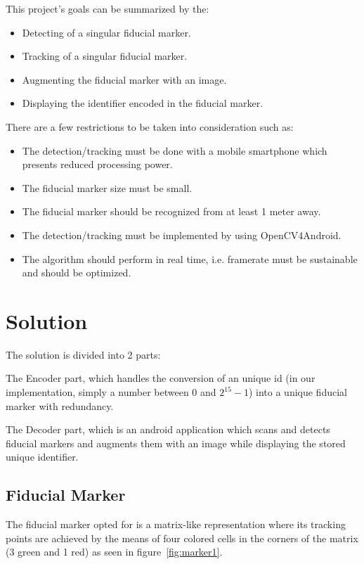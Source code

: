 \documentclass[DIV=calc, paper=a4, fontsize=11pt, twocolumn]{scrartcl}   %
\begin{document}
This project’s goals can be summarized by the:
\begin{itemize}
\item Detecting of a singular fiducial marker.
\item Tracking of a singular fiducial marker.
\item Augmenting the fiducial marker with an image.
\item Displaying the identifier encoded in the fiducial marker.
\end{itemize}

There are a few restrictions to be taken into consideration such as:
\begin{itemize}
\item The detection/tracking must be done with a mobile smartphone which presents reduced processing power.
\item The fiducial marker size must be small.
\item The fiducial marker should be recognized from at least 1 meter away.
\item The detection/tracking must be implemented by using OpenCV4Android.
\item The algorithm should perform in real time, i.e. framerate must be sustainable and should be optimized.
\end{itemize}

\section*{Solution}

The solution is divided into 2 parts:


\begin{inparaenum}[(i)]
\item The Encoder part, which handles the conversion of an unique id (in our implementation, simply a number between 0 and $2^{15} - 1$) into a unique fiducial marker with redundancy. 


\item The Decoder part, which is an android application which scans and detects fiducial markers and augments them with an image while displaying the stored unique identifier.
\end{inparaenum}


\subsection*{Fiducial Marker}
The fiducial marker opted for is a matrix-like representation where its tracking points are achieved by the means of four colored cells in the corners of the matrix (3 green and 1 red) as seen in figure~\ref{fig:marker1}.
\end{document}
